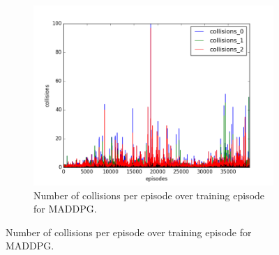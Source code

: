 \begin{figure}[h]
\begin{subfigure}[h]{\figscale\linewidth}
    \includegraphics[trim=10 10 10 10,clip,width=\linewidth]
    {../results/maddpg_2vs1/collisions.png}
    \caption{Number of collisions per episode over training episode for MADDPG.}
    \label{fig:maddpg-2vs1-collisions}
  \end{subfigure}


\end{figure}
